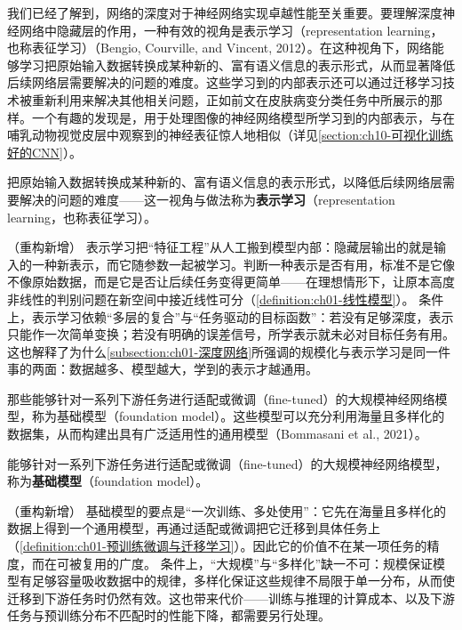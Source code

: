 \documentclass[../../main.tex]{subfiles}
\begin{document}
我们已经了解到，网络的深度对于神经网络实现卓越性能至关重要。要理解深度神经网络中隐藏层的作用，一种有效的视角是表示学习（representation learning，也称表征学习）（Bengio, Courville, and Vincent, 2012）。在这种视角下，网络能够学习把原始输入数据转换成某种新的、富有语义信息的表示形式，从而显著降低后续网络层需要解决的问题的难度。这些学习到的内部表示还可以通过迁移学习技术被重新利用来解决其他相关问题，正如前文在皮肤病变分类任务中所展示的那样。一个有趣的发现是，用于处理图像的神经网络模型所学习到的内部表示，与在哺乳动物视觉皮层中观察到的神经表征惊人地相似（详见\cref{section:ch10-可视化训练好的CNN}）。

\begin{definition}[表示学习]\label{definition:ch01-表示学习}
把原始输入数据转换成某种新的、富有语义信息的表示形式，以降低后续网络层需要解决的问题的难度——这一视角与做法称为\textbf{表示学习}（representation learning，也称表征学习）。
\end{definition}

\begin{remark}（重构新增）
表示学习把“特征工程”从人工搬到模型内部：隐藏层输出的就是输入的一种新表示，而它随参数一起被学习。判断一种表示是否有用，标准不是它像不像原始数据，而是它是否让后续任务变得更简单——在理想情形下，让原本高度非线性的判别问题在新空间中接近线性可分（\cref{definition:ch01-线性模型}）。
条件上，表示学习依赖“多层的复合”与“任务驱动的目标函数”：若没有足够深度，表示只能作一次简单变换；若没有明确的误差信号，所学表示就未必对目标任务有用。这也解释了为什么\cref{subsection:ch01-深度网络}所强调的规模化与表示学习是同一件事的两面：数据越多、模型越大，学到的表示才越通用。
\end{remark}

那些能够针对一系列下游任务进行适配或微调（fine-tuned）的大规模神经网络模型，称为基础模型（foundation model）。这些模型可以充分利用海量且多样化的数据集，从而构建出具有广泛适用性的通用模型（Bommasani et al., 2021）。

\begin{definition}[基础模型]\label{definition:ch01-基础模型}
能够针对一系列下游任务进行适配或微调（fine-tuned）的大规模神经网络模型，称为\textbf{基础模型}（foundation model）。
\end{definition}

\begin{remark}（重构新增）
基础模型的要点是“一次训练、多处使用”：它先在海量且多样化的数据上得到一个通用模型，再通过适配或微调把它迁移到具体任务上（\cref{definition:ch01-预训练微调与迁移学习}）。因此它的价值不在某一项任务的精度，而在可被复用的广度。
条件上，“大规模”与“多样化”缺一不可：规模保证模型有足够容量吸收数据中的规律，多样化保证这些规律不局限于单一分布，从而使迁移到下游任务时仍然有效。这也带来代价——训练与推理的计算成本、以及下游任务与预训练分布不匹配时的性能下降，都需要另行处理。
\end{remark}
\end{document}
